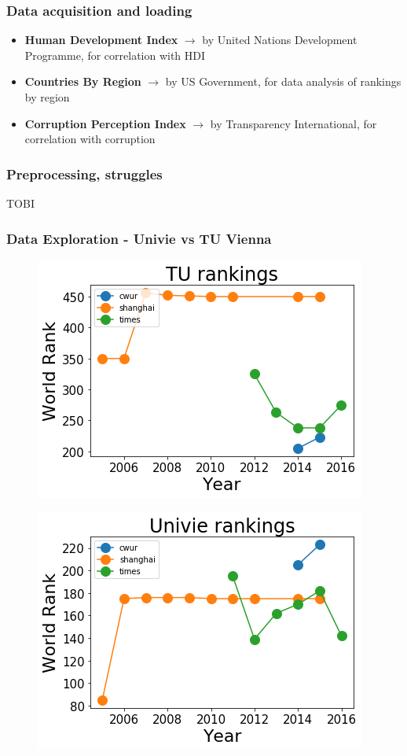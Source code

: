 \documentclass[mathserif,notheorems,11pt]{beamer}
\begin{document}
\begin{frame}
\frametitle{Data acquisition and loading}
\begin{itemize}
	\item \textbf{Human Development Index} $\rightarrow$  by United Nations Development Programme, for correlation with HDI
\item \textbf{Countries By Region}  $\rightarrow$  by US Government, for data analysis of rankings by region
\item \textbf{Corruption Perception Index} $\rightarrow$  by Transparency International, for correlation with corruption
\end{itemize}

\end{frame}

\begin{frame}
\frametitle{Preprocessing, struggles}
TOBI
\end{frame}

\begin{frame}
\frametitle{Data Exploration - Univie vs TU Vienna}
\begin{figure}
	\centering
	\includegraphics[width=0.45\linewidth]{graphs/tu_univie_rank_graph}
	
\end{figure}
\begin{figure}
	\centering
	\includegraphics[width=0.45\linewidth]{graphs/tu_rank_graph}
	
\end{figure}



\end{frame}
\end{document}
